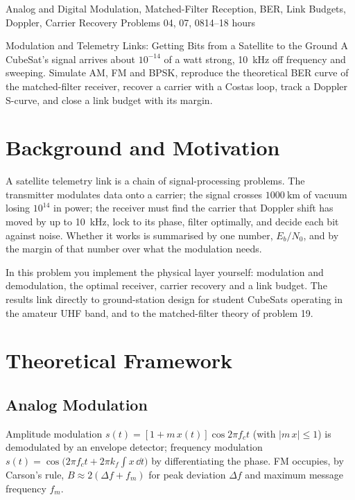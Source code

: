 \documentclass[11pt,a4paper]{article}
\begin{document}
%
{Analog and Digital Modulation, Matched-Filter Reception, BER, Link Budgets, Doppler, Carrier Recovery}%
{Problems 04, 07, 08}{14--18 hours}

\begin{summarybox}{Modulation and Telemetry Links: Getting Bits from a Satellite to the Ground}
A CubeSat's signal arrives about $10^{-14}$ of a watt strong, \SI{10}{\kilo\hertz} off frequency and sweeping. Simulate AM, FM and BPSK, reproduce the theoretical BER curve of the matched-filter receiver, recover a carrier with a Costas loop, track a Doppler S-curve, and close a link budget with its margin.
\end{summarybox}


\section*{Background and Motivation}
A satellite telemetry link is a chain of signal-processing problems. The transmitter modulates data onto a carrier; the signal crosses $\SI{1000}{\kilo\metre}$ of vacuum losing $10^{14}$ in power; the receiver must find the carrier that Doppler shift has moved by up to \SI{10}{\kilo\hertz}, lock to its phase, filter optimally, and decide each bit against noise. Whether it works is summarised by one number, $E_b/N_0$, and by the margin of that number over what the modulation needs.

In this problem you implement the physical layer yourself: modulation and demodulation, the optimal receiver, carrier recovery and a link budget. The results link directly to ground-station design for student CubeSats operating in the amateur UHF band, and to the matched-filter theory of problem 19.

\section*{Theoretical Framework}
\subsection{Analog Modulation}
Amplitude modulation $s(t)=[1+m\,x(t)]\cos2\pi f_ct$ (with $|m\,x|\le1$) is demodulated by an envelope detector; frequency modulation $s(t)=\cos\!\big(2\pi f_ct+2\pi k_f\!\int x\,\dd t\big)$ by differentiating the phase. FM occupies, by Carson's rule, $B\approx2(\Delta f+f_m)$ for peak deviation $\Delta f$ and maximum message frequency $f_m$.
\end{document}
